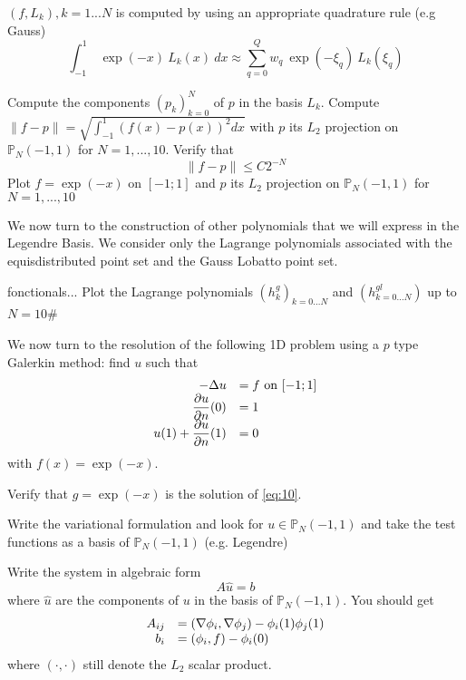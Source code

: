\documentclass{article}
\begin{document}
\begin{Answer}[title={p type Galerkin method in 1D}]
  $(f,L_k), k=1...N$ is computed by using an appropriate quadrature
  rule (e.g Gauss)
  \begin{equation}
    \label{eq:8}
    \int_{-1}^1\ \exp(-x)\ L_k(x)\ dx \approx \sum_{q=0}^Q w_q\ \exp(-\xi_q)\ L_k(\xi_q)
  \end{equation}
  
  \Question Compute the components $(p_k)_{k=0}^N$ of $p$ in the basis
  $L_k$.  
  \Question Compute $\|f-p\|=\sqrt{\int_{-1}^1 (f(x)-p(x))^2 dx}$ with $p$ its $L_2$ projection on
  $\mathbb{P}_N(-1,1)$ for $N=1,...,10$. Verify that
  \begin{equation}
    \label{eq:9}
    \|f-p\| \leq C 2^{-N}
  \end{equation}
  \Question Plot $f=\exp(-x)$
  on $[-1;1]$ and $p$ its $L_2$ projection on $\mathbb{P}_N(-1,1)$ for
  $N=1,...,10$
  
  \ExePart We now turn to the construction of other polynomials that
  we will express in the Legendre Basis. We consider only the Lagrange
  polynomials associated with the equisdistributed point set and the
  Gauss Lobatto point set.

  \Question fonctionals...
  \Question Plot the Lagrange polynomials $(h^g_k)_{k=0...N}$ and $(h^{gl}_{k=0...N})$ up to $N=10$# 

  \ExePart 
  We now turn to the resolution of the following 1D problem using a $p$ type Galerkin method: find $u$ such that
  \begin{equation}
    \label{eq:10}
    \begin{array}[c]{rl}
      -\Delta u &= f \text{ on } [-1;1]\\
      \displaystyle \frac{\partial u}{\partial n}(0) &= 1\\
      \displaystyle u(1) + \frac{\partial u}{\partial n}(1) &= 0\\
    \end{array}
  \end{equation}
  with $f(x)=\exp(-x)$.
  
  \Question Verify that $g=\exp(-x)$ is the solution  of \eqref{eq:10}.

  \Question Write the variational formulation and look for $u \in
  \mathbb{P}_N(-1,1)$ and take the test functions as a basis of
  $\mathbb{P}_N(-1,1)$ (e.g. Legendre)

  \Question Write the system in algebraic form
  \begin{equation}
    \label{eq:11}
    A \hat{u} = b
  \end{equation}
  where $\hat{u}$ are the components of $u$ in the basis of
  $\mathbb{P}_N(-1,1)$.
  You should get 
  \begin{equation}
    \label{eq:12}
    \begin{array}[c]{rl}
      A_{ij} &= (\nabla \phi_i, \nabla \phi_j) - \phi_i(1)\phi_j(1)\\
      b_i &= (\phi_i,f) - \phi_i(0)
    \end{array}
  \end{equation}
  where $(\cdot,\cdot)$ still denote the $L_2$ scalar product.


\end{Answer}
\end{document}

